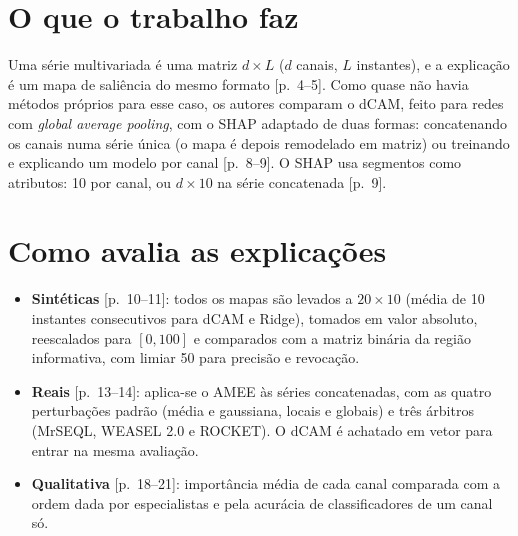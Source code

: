 \documentclass[11pt,a4paper]{article}
\begin{document}
\section{O que o trabalho faz}
Uma série multivariada é uma matriz $d \times L$ ($d$ canais, $L$ instantes), e a explicação é um mapa de saliência do mesmo formato [p.~4--5]. Como quase não havia métodos próprios para esse caso, os autores comparam o dCAM, feito para redes com \textit{global average pooling}, com o SHAP adaptado de duas formas: concatenando os canais numa série única (o mapa é depois remodelado em matriz) ou treinando e explicando um modelo por canal [p.~8--9]. O SHAP usa segmentos como atributos: 10 por canal, ou $d \times 10$ na série concatenada [p.~9].

\section{Como avalia as explicações}
\begin{itemize}
\item \textbf{Sintéticas} [p.~10--11]: todos os mapas são levados a $20 \times 10$ (média de 10 instantes consecutivos para dCAM e Ridge), tomados em valor absoluto, reescalados para $[0,100]$ e comparados com a matriz binária da região informativa, com limiar 50 para precisão e revocação.
\item \textbf{Reais} [p.~13--14]: aplica-se o AMEE às séries concatenadas, com as quatro perturbações padrão (média e gaussiana, locais e globais) e três árbitros (MrSEQL, WEASEL 2.0 e ROCKET). O dCAM é achatado em vetor para entrar na mesma avaliação.
\item \textbf{Qualitativa} [p.~18--21]: importância média de cada canal comparada com a ordem dada por especialistas e pela acurácia de classificadores de um canal só.
\end{itemize}
\end{document}
